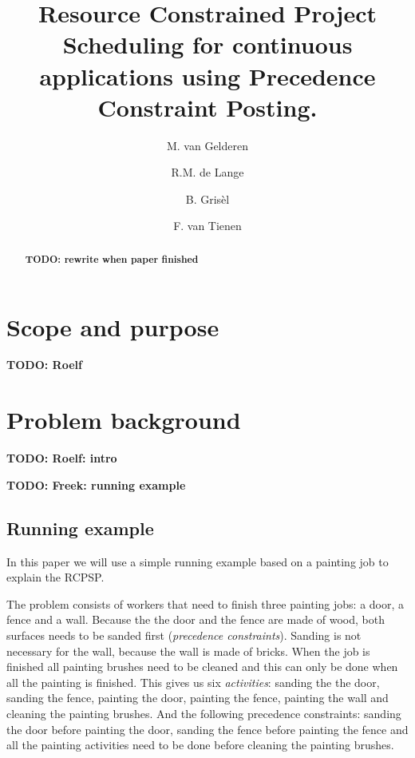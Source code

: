 \documentclass{article}
\title{Resource Constrained Project Scheduling for continuous applications using Precedence Constraint Posting.}
\author{M. van Gelderen  \and
    R.M. de Lange \and
    B. Gris\`el \and
    F. van Tienen}
\date{}
\theoremstyle{definition}
\newcommand{\TODO}[1]{{\color{red}\textbf{TODO: #1}}}
\begin{document}
\maketitle
\thispagestyle{empty}

\begin{abstract}
\TODO{rewrite when paper finished}
\end{abstract}


\newpage


\section{Scope and purpose}

\TODO{Roelf}


\newpage


\section{Problem background}

\TODO{Roelf: intro}

\TODO{Freek: running example}

\subsection{Running example}
In this paper we will use a simple running example based on a painting job to explain the RCPSP.

The problem consists of workers that need to finish three painting jobs: a door, a fence and a wall.
Because the the door and the fence are made of wood, both surfaces needs to be sanded first (\emph{precedence constraints}).
Sanding is not necessary for the wall, because the wall is made of bricks.
When the job is finished all painting brushes need to be cleaned and this can only be done when all the painting is finished.
This gives us six \emph{activities}: sanding the the door, sanding the fence,  painting the door, painting the fence, painting the wall and cleaning the painting brushes.
And the following precedence constraints: sanding the door before painting the door, sanding the fence before painting the fence and all the painting activities need to be done before cleaning the painting brushes.
\end{document}
